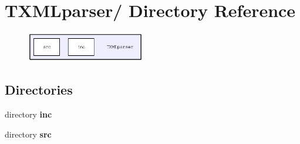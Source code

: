 \section{TXMLparser/ Directory Reference}
\label{dir_3c37781bdab63440062d230a6c9916d3}


\begin{figure}[H]
\begin{center}
\leavevmode
\includegraphics[width=146pt]{dir_3c37781bdab63440062d230a6c9916d3_dep}
\end{center}
\end{figure}
\subsection*{Directories}
\begin{CompactItemize}
\item 
directory \bf{inc}
\item 
directory \bf{src}
\end{CompactItemize}

